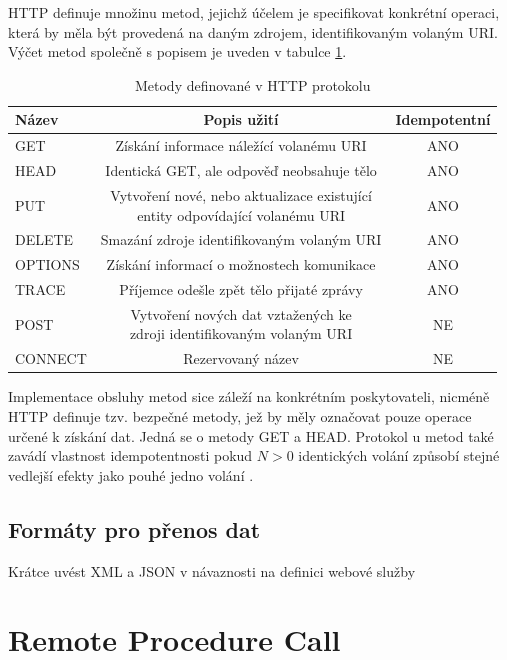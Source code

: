\documentclass[czech,DP]{thesiskiv}
\begin{document}
HTTP definuje množinu metod, jejichž účelem je specifikovat konkrétní operaci, která by měla být provedená na daným zdrojem, identifikovaným volaným URI. Výčet metod společně s popisem je uveden v tabulce \ref{tab:http-methods}.

\begin{table}[h]
	\centering
	\begin{tabular}{|l|c|c|}
		\hline
		Název & Popis užití & Idempotentní \\
		\hline
		\hline
		GET & Získání informace náležící volanému URI & ANO \\
		\hline
		HEAD & Identická GET, ale odpověď neobsahuje tělo & ANO \\
		\hline
		PUT & \makecell{Vytvoření nové, nebo aktualizace existující \\ entity odpovídající volanému URI }  & ANO \\
		\hline
		DELETE & Smazání zdroje identifikovaným volaným URI & ANO \\
		\hline
		OPTIONS & Získání informací o možnostech komunikace  & ANO \\
		\hline
		TRACE & Příjemce odešle zpět tělo přijaté zprávy & ANO \\
		\hline
		POST & \makecell{Vytvoření nových dat vztažených ke \\ zdroji identifikovaným volaným URI} & NE \\
		\hline
		CONNECT & Rezervovaný název & NE \\
		\hline		
	\end{tabular}
	\caption{Metody definované v HTTP protokolu}
	\label{tab:http-methods}
\end{table}

Implementace obsluhy metod sice záleží na konkrétním poskytovateli, nicméně HTTP definuje tzv. bezpečné metody, jež by měly označovat pouze operace určené k získání dat. Jedná se o metody GET a HEAD. Protokol u metod také zavádí vlastnost idempotentnosti pokud $N>0$ identických volání způsobí stejné vedlejší efekty jako pouhé jedno volání \cite{httpRfc}.


\subsection{Formáty pro přenos dat}

Krátce uvést XML a JSON v návaznosti na definici webové služby

\section{Remote Procedure Call}
\label{sec:rpc-ws}
\end{document}
